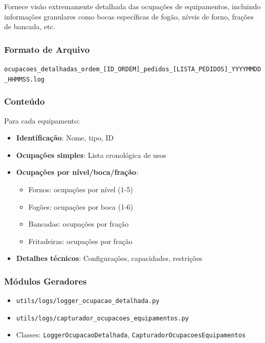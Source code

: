 \documentclass[11pt,a4paper]{article}
\begin{document}
Fornece visão extremamente detalhada das ocupações de equipamentos, incluindo informações granulares como bocas específicas de fogão, níveis de forno, frações de bancada, etc.

\subsubsection{Formato de Arquivo}

\texttt{ocupacoes\_detalhadas\_ordem\_[ID\_ORDEM]\_pedidos\_[LISTA\_PEDIDOS]\_YYYYMMDD\_HHMMSS.log}

\subsubsection{Conteúdo}

Para cada equipamento:
\begin{itemize}[leftmargin=2cm]
    \item \textbf{Identificação}: Nome, tipo, ID
    \item \textbf{Ocupações simples}: Lista cronológica de usos
    \item \textbf{Ocupações por nível/boca/fração}:
    \begin{itemize}
        \item Fornos: ocupações por nível (1-5)
        \item Fogões: ocupações por boca (1-6)
        \item Bancadas: ocupações por fração
        \item Fritadeiras: ocupações por fração
    \end{itemize}
    \item \textbf{Detalhes técnicos}: Configurações, capacidades, restrições
\end{itemize}

\subsubsection{Módulos Geradores}

\begin{itemize}
    \item \texttt{utils/logs/logger\_ocupacao\_detalhada.py}
    \item \texttt{utils/logs/capturador\_ocupacoes\_equipamentos.py}
    \item Classes: \texttt{LoggerOcupacaoDetalhada}, \texttt{CapturadorOcupacoesEquipamentos}
\end{itemize}
\end{document}

